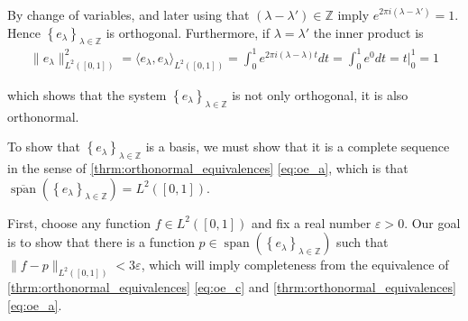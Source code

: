 \documentclass[../thesis.tex]{subfiles}
\begin{document}
By change of variables, and later using that $(\lambda-\lambda') \in \mathbb{Z}$ imply $e^{2 \pi i (\lambda-\lambda')} = 1$. Hence $\left\{ e_{\lambda} \right\}_{\lambda\in \mathbb{Z}}$ is orthogonal. Furthermore, if  $\lambda =\lambda'$ the inner product is
\begin{align}\label{eq:exp_norm_one}
    \| e_\lambda \|^2_{L^2([0,1])} 
    = \langle e_{\lambda},e_{\lambda} \rangle_{L^2([0,1])} 
    = \int_0^1 e^{2 \pi i (\lambda-\lambda)t} dt
    = \int_0^1 e^{0} dt = t  \big| _0^{1}= 1
\end{align}

which shows that the system $\left\{ e_{\lambda} \right\}_{\lambda\in \mathbb{Z}}$ is not only orthogonal, it is also orthonormal. 


To show that $\left\{ e_{\lambda} \right\}_{\lambda\in \mathbb{Z}}$ is a basis, we must show that it is a complete sequence in the sense of \cref{thrm:orthonormal_equivalences} \cref{eq:oe_a}, which is that $\overline{\operatorname{span}} \left( \left\{ e_{\lambda} \right\}_{\lambda\in \mathbb{Z}} \right) = L^2{([0,1])}$.

First, choose any function $f\in L^2([0,1])$ and fix a real number $\varepsilon >0$. Our goal is to show that there is a function $p \in \operatorname{span} \left( \left\{ e_{\lambda} \right\}_{\lambda\in \mathbb{Z}} \right)$ such that $\|f-p\|_{L^2([0,1])} < 3 \varepsilon$, which will imply completeness from the equivalence of \cref{thrm:orthonormal_equivalences} \cref{eq:oe_c} and \cref{thrm:orthonormal_equivalences} \cref{eq:oe_a}.
\end{document}
